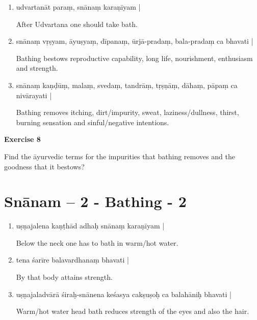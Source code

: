 \begin{enumerate}
\item {}

udvartanāt paraṃ, snānaṃ karaṇīyam | 

After Udvartana one should take bath. 

\item {}

snānaṃ vṛṣyam, āyuṣyaṃ, dīpanaṃ, ūrjā-pradaṃ, bala-pradaṃ  ca bhavati |

Bathing bestows reproductive capability, long life, nourishment, enthusiasm and strength.     

\item {}

snānaṃ kaṇḍūṃ, malaṃ, svedaṃ, tandrāṃ, tṛṣṇāṃ, dāhaṃ, pāpaṃ ca nivārayati |  

Bathing removes itching, dirt/impurity, sweat, laziness/dullness, thirst, burning sensation and sinful/negative intentions.
\end{enumerate}

\begin{center}
\textbf{\large Exercise 8}
\end{center}

Find the āyurvedic terms for the impurities that bathing removes and the goodness that it bestows? 

\chapter{Snānam – 2 - Bathing - 2}

\begin{enumerate}
\item {}

uṣṇajalena kaṇṭhād adhaḥ snānaṃ karaṇīyam | 

Below the neck one has to bath in warm/hot water. 

\item {}

tena śarīre balavardhanaṃ bhavati | 

By that body attains strength. 

\item {}

uṣṇajaladvārā śiraḥ-snānena keśasya cakṣuṣoḥ ca balahāniḥ bhavati |  

Warm/hot water head bath reduces strength of the eyes and also the hair.
\end{enumerate}

